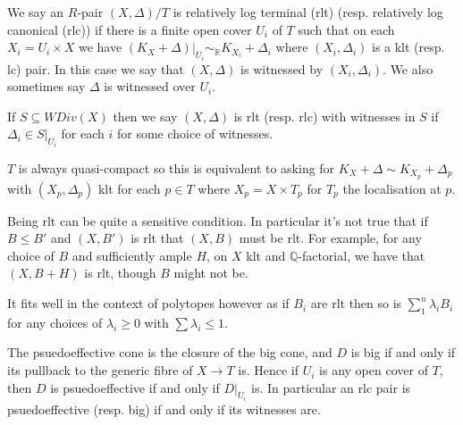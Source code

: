 \documentclass[a4paper,12pt]{amsart}
\begin{document}
	\begin{definition}
		We say an $R$-pair $(X,\Delta)/T$ is relatively log terminal (rlt) (resp. relatively log canonical (rlc)) if there is a finite open cover $U_{i}$ of $T$ such that on each $X_{i}=U_{i} \times X$ we have $(K_{X}+\Delta)|_{U_{i}} \sim_{\mathbb{R}} K_{X_{i}}+\Delta_{i}$ where $(X_{i},\Delta_{i})$ is a klt (resp. lc) pair. In this case we say that $(X,\Delta)$ is witnessed by $(X_{i},\Delta_{i})$. We also sometimes say $\Delta$ is witnessed over $U_{i}$. 
		
		If $S \subseteq WDiv(X)$ then we say $(X,\Delta)$ is rlt (resp. rlc) with witnesses in $S$ if $\Delta_{i} \in S|_{U_{i}}$ for each $i$ for some choice of witnesses.
	\end{definition}
	\begin{remark}
		$T$ is always quasi-compact so this is equivalent to asking for $K_{X}+\Delta \sim K_{X_{p}}+\Delta_{p}$ with $(X_{p},\Delta_{p})$ klt for each $p \in T$ where $X_{p}=X \times T_{p}$ for $T_{p}$ the localisation at $p$.
	\end{remark}
	
	Being rlt can be quite a sensitive condition. In particular it's not true that if $B \leq B'$ and $(X,B')$ is rlt that $(X,B)$ must be rlt. For example, for any choice of $B$ and sufficiently ample $H$, on $X$ klt and $\mathbb{Q}$-factorial, we have that $(X,B+H)$ is rlt, though $B$ might not be.
	
	It fits well in the context of polytopes however as if $B_{i}$ are rlt then so is $\sum_{1}^{n} \lambda_{i}B_{i}$ for any choices of $\lambda_{i} \geq 0$ with $\sum \lambda_{i} \leq 1$.
	
	The psuedoeffective cone is the closure of the big cone, and $D$ is big if and only if its pullback to the generic fibre of $X \to T$ is. Hence if $U_{i}$ is any open cover of $T$, then $D$ is psuedoeffective if and only if $D|_{U_{i}}$ is. In particular an rlc pair is psuedoeffective (resp. big) if and only if its witnesses are.
	
\end{document}
